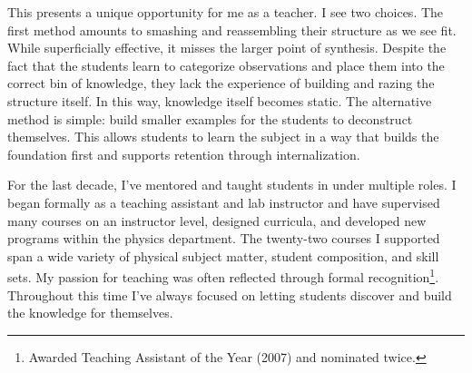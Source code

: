 \documentclass[]{scrartcl}
\begin{document}
\begin{cleanCV}
\begin{minipage}{14 cm}
This presents a unique opportunity for me as a teacher. 
I see two choices.
The first method amounts to smashing and reassembling their structure as we see fit.
While superficially effective, it misses the larger point of synthesis.
Despite the fact that the students learn to categorize observations and place them into the correct bin of knowledge, they lack the experience of building and razing the structure itself. 
In this way, knowledge itself becomes static. 
The alternative method is simple: build smaller examples for the students to deconstruct themselves.
This allows students to learn the subject in a way that builds the foundation first and supports retention through internalization.

For the last decade, I've mentored and taught students in under multiple roles.
I began formally as a teaching assistant and lab instructor and have supervised many courses on an instructor level, designed curricula, and developed new programs within the physics department.
The twenty-two courses I supported span a wide variety of physical subject matter, student composition, and skill sets.
My passion for teaching was often reflected through formal recognition\footnote{Awarded Teaching Assistant of the Year (2007) and nominated twice.}.
Throughout this time I've always focused on letting students discover and build the knowledge for themselves.



\end{minipage}

\end{cleanCV}
\end{document}
